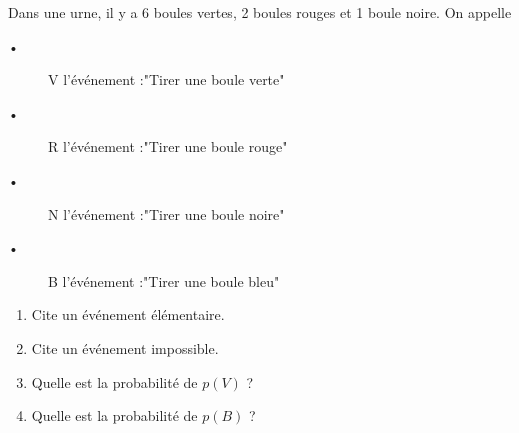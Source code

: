 
Dans une urne, il y a 6 boules vertes, 2 boules rouges et 1 boule noire.
On appelle 
\begin{description}
\item[•] V l'événement :"Tirer une boule verte"
\item[•] R l'événement :"Tirer une boule rouge"
\item[•] N l'événement :"Tirer une boule noire"
\item[•] B l'événement :"Tirer une boule bleu"
\end{description}


\begin{enumerate}
\item Cite un événement élémentaire.
\item Cite un événement impossible.
\item Quelle est la probabilité de $p(V)$ ?
\item Quelle est la probabilité de $p(B)$ ?
\end{enumerate}
